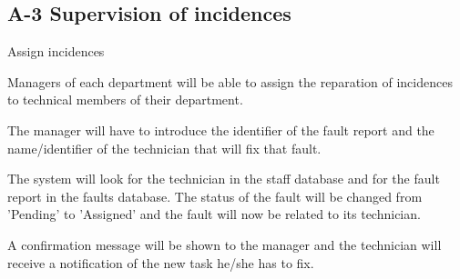 \subsection{A-3 Supervision of incidences}
\begin{requirement}{Assign incidences}

\reqdesc Managers of each department will be able to assign the reparation of incidences to technical members of their department.

\reqin The manager will have to introduce the identifier of the fault report and the name/identifier of the technician that will fix that fault.

\reqsteps The system will look for the technician in the staff database and for the fault report in the faults database. The status of the fault will be changed from 'Pending' to 'Assigned' and the fault will now be related to its technician.

\reqout A confirmation message will be shown to the manager and the technician will receive a notification of the new task he/she has to fix.

\end{requirement}
